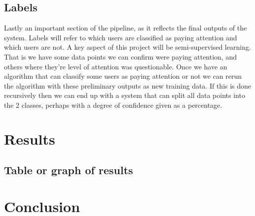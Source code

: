 \documentclass{article}
\begin{document}
\subsection{Labels}


Lastly an important section of the pipeline, as it reflects the final outputs of the system.
Labels will refer to which users are classified as paying attention and which users are not.
A key aspect of this project will be semi-supervised learning.
That is we have some data points we can confirm were paying attention, and others where they're level of attention was questionable.
Once we have an algorithm that can classify some users as paying attention or not we can rerun the algorithm with these preliminary outputs as new training data.
If this is done recursively then we can end up with a system that can split all data points into the 2 classes, perhaps with a degree of confidence given as a percentage.

\section{Results}


\subsection{Table or graph of results}

\section{Conclusion}



\printbibliography
\end{document}
